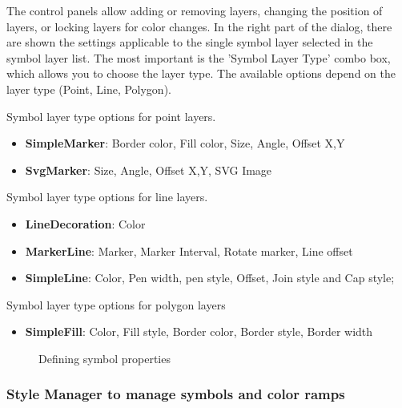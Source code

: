 The control panels allow adding or removing layers, changing the position of layers, 
or locking layers for color changes. In the right part of the dialog, there are 
shown the settings applicable to the single symbol layer selected in the symbol 
layer list. The most important is the 'Symbol Layer Type' combo box, which allows 
you to choose the layer type. The available options depend on the layer type 
(Point, Line, Polygon). 

\begin{description}
\item Symbol layer type options for point layers.
\begin{itemize}
\item \textbf{SimpleMarker}: Border color, Fill color, Size, Angle, Offset X,Y
\item \textbf{SvgMarker}: Size, Angle, Offset X,Y, SVG Image
\end{itemize}
\item Symbol layer type options for line layers.
\begin{itemize}
\item \textbf{LineDecoration}: Color
\item \textbf{MarkerLine}: Marker, Marker Interval, Rotate marker, Line offset
\item \textbf{SimpleLine}: Color, Pen width, pen style, Offset, Join style and Cap style;
\end{itemize}
\item Symbol layer type options for polygon layers
\begin{itemize}
\item \textbf{SimpleFill}: Color, Fill style, Border color, Border style, Border width 
\end{itemize}
\end{description}


\begin{figure}[h]
\centering
\caption{Defining symbol properties \nixcaption}
   \goodgap
   \goodgap
\end{figure}

\subsubsection{Style Manager to manage symbols and color ramps}\label{subsec:stylemanager}

